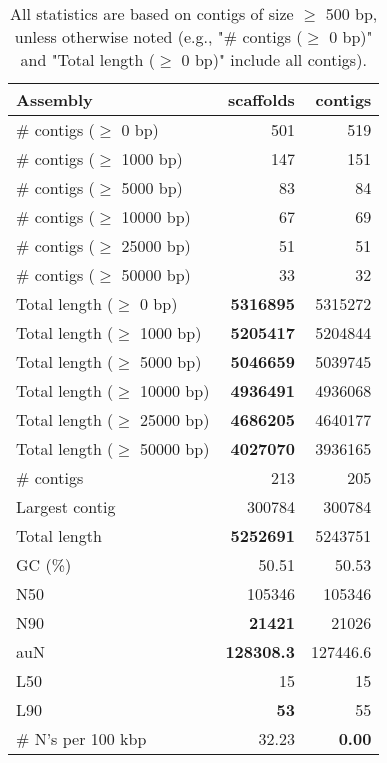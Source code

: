 \documentclass[12pt,a4paper]{article}
\begin{document}
\begin{table}[ht]
\begin{center}
\caption{All statistics are based on contigs of size $\geq$ 500 bp, unless otherwise noted (e.g., "\# contigs ($\geq$ 0 bp)" and "Total length ($\geq$ 0 bp)" include all contigs).}
\begin{tabular}{|l*{2}{|r}|}
\hline
Assembly & scaffolds & contigs \\ \hline
\# contigs ($\geq$ 0 bp) & 501 & 519 \\ \hline
\# contigs ($\geq$ 1000 bp) & 147 & 151 \\ \hline
\# contigs ($\geq$ 5000 bp) & 83 & 84 \\ \hline
\# contigs ($\geq$ 10000 bp) & 67 & 69 \\ \hline
\# contigs ($\geq$ 25000 bp) & 51 & 51 \\ \hline
\# contigs ($\geq$ 50000 bp) & 33 & 32 \\ \hline
Total length ($\geq$ 0 bp) & {\bf 5316895} & 5315272 \\ \hline
Total length ($\geq$ 1000 bp) & {\bf 5205417} & 5204844 \\ \hline
Total length ($\geq$ 5000 bp) & {\bf 5046659} & 5039745 \\ \hline
Total length ($\geq$ 10000 bp) & {\bf 4936491} & 4936068 \\ \hline
Total length ($\geq$ 25000 bp) & {\bf 4686205} & 4640177 \\ \hline
Total length ($\geq$ 50000 bp) & {\bf 4027070} & 3936165 \\ \hline
\# contigs & 213 & 205 \\ \hline
Largest contig & 300784 & 300784 \\ \hline
Total length & {\bf 5252691} & 5243751 \\ \hline
GC (\%) & 50.51 & 50.53 \\ \hline
N50 & 105346 & 105346 \\ \hline
N90 & {\bf 21421} & 21026 \\ \hline
auN & {\bf 128308.3} & 127446.6 \\ \hline
L50 & 15 & 15 \\ \hline
L90 & {\bf 53} & 55 \\ \hline
\# N's per 100 kbp & 32.23 & {\bf 0.00} \\ \hline
\end{tabular}
\end{center}
\end{table}
\end{document}
